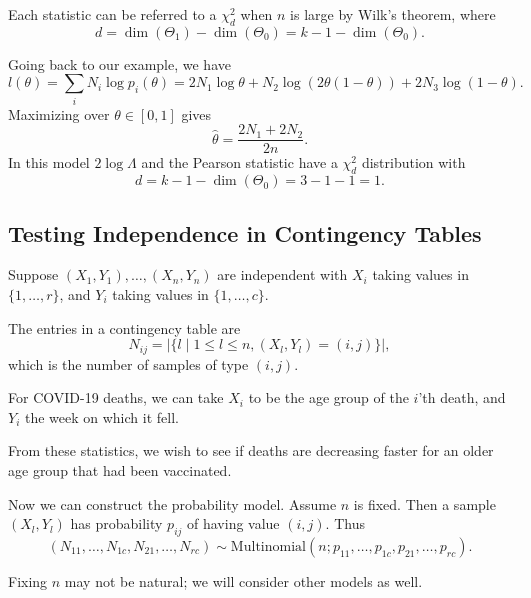 \documentclass[12pt]{article}
\begin{document}
Each statistic can be referred to a $\chi_{d}^2$ when $n$ is large by Wilk's theorem, where
\[
d = \dim (\Theta_1) - \dim (\Theta_0) = k - 1 - \dim(\Theta_0).
\]
\begin{exbox}
	Going back to our example, we have
	\[
	l(\theta) = \sum_{i} N_i \log p_i(\theta) = 2 N_1 \log \theta + N_2 \log(2\theta(1-\theta)) + 2N_3 \log(1-\theta).
	\]
	Maximizing over $\theta \in [0, 1]$ gives
	\[
	\hat \theta = \frac{2N_1 + 2N_2}{2n}.
	\]
	In this model $2 \log \Lambda$ and the Pearson statistic have a $\chi^2_d$ distribution with
	\[
	d = k - 1 - \dim (\Theta_0) = 3 - 1 - 1 = 1.
	\]
\end{exbox}

\subsection{Testing Independence in Contingency Tables}
\label{sub:testing_independence_in_contingency_tables}

Suppose $(X_1, Y_1), \ldots, (X_n, Y_n)$ are independent with $X_i$ taking values in $\{1, \ldots, r\}$, and $Y_i$ taking values in $\{1, \ldots, c\}$.

The entries in a contingency table are
\[
	N_{ij} = | \{l \mid 1 \leq l \leq n , (X_l, Y_l) = (i,j)\}|,
\]
which is the number of samples of type $(i,j)$.

\begin{exbox}
	For COVID-19 deaths, we can take $X_i$ to be the age group of the $i$'th death, and $Y_i$ the week on which it fell.

	From these statistics, we wish to see if deaths are decreasing faster for an older age group that had been vaccinated.
\end{exbox}

Now we can construct the probability model. Assume $n$ is fixed. Then a sample $(X_l, Y_l)$ has probability $p_{ij}$ of having value $(i,j)$. Thus
\[
	(N_{11}, \ldots, N_{1c}, N_{21}, \ldots, N_{rc}) \sim \mathrm{Multinomial}(n;p_{11}, \ldots, p_{1c}, p_{21}, \ldots, p_{rc}).
\]
\begin{remark}
	Fixing $n$ may not be natural; we will consider other models as well.
\end{remark}
\end{document}
